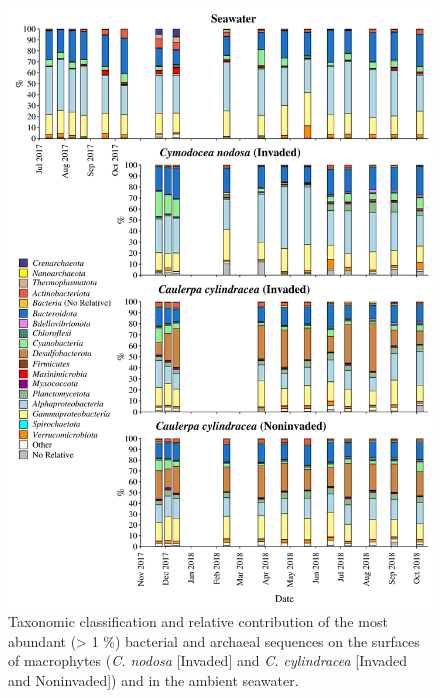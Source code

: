 \documentclass[12pt,]{article}
\begin{document}
\begin{figure}[H]

{\centering \includegraphics[width=0.85\linewidth]{../results/figures/community_bar_plot} 

}

\caption{Taxonomic classification and relative contribution of the most abundant (> 1 \si{\percent}) bacterial and archaeal sequences on the surfaces of macrophytes (\textit{C. nodosa} [Invaded] and \textit{C. cylindracea} [Invaded and Noninvaded]) and in the ambient seawater.\label{community}}\label{fig:unnamed-chunk-4}
\end{figure}
\end{document}
